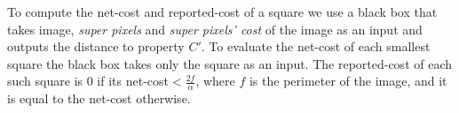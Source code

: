 \documentclass[11pt,english]{article}
\newtheorem{theorem}{Theorem}[section]
\newtheorem{definition}{Definition}[section]
\numberwithin{figure}{section}
\newcommand{\eps}{{\epsilon}}
\newcommand{\integerset}[1]{[0..{#1})}
\newcommand{\gp}{\text{GP}}
\newcommand{\lind}{t}
\begin{document}
To compute the net-cost and reported-cost of a square we use a black box that takes   image, \emph{super pixels} and \emph{super pixels' cost} of the image as an input and outputs the distance to property $C'$. To evaluate the net-cost of each smallest square the black box takes only the square as an input. The reported-cost of each such square is $0$ if its net-cost$ < \frac{2f}{\alpha}$, where $f$ is the perimeter of the image, and it is equal to the net-cost otherwise.
\fi

\begin{comment}
\subsection{Tester for Connectedness}\label{sec:connectedness-tester}
\begin{theorem}\label{thm:connectedness_tester}
There is a block-uniform (1-sided error) $\eps$-tester for connectedness with sample and time complexity $O(\frac{1}{\eps^{2}})$.
\end{theorem}
\begin{proof}
Observe that a tester can safely reject if it finds a small connected component and a black pixel outside it.
Our tester (Algorithm~\ref{alg:connectedness_tester-na}) looks for squares that contain small connected components, that is, are not border-connected, which we call witnesses. To find a witness, it samples $r$-squares for $\log\frac 1 \eps+1$ values of $r,$ which we call levels. In each subsequent level, the number of samples is doubled, but the side length of the squares is halved, i.e., the number of pixels in them is divided by 4.
If it finds a witness, it samples pixels to look for black pixels outside the witness.

\ifnum\full=1
For simplicity
of the analysis of the algorithm we assume\footnote {This assumption can be made
w.l.o.g.\ because if $n\in(2^{i-1}+1,2^{i}+1)$ for some $i$, instead of the original image $M$ we can consider a $(2^{i}+1)\times (2^{i}+1)$ image $M'$, which is equal to $M$ on the corresponding coordinates and has white pixels everywhere else. Let
$\eps'=\eps n^{2}/(2^{i}+1)^{2}$.
To $\eps$-test $M$ for connectedness, it suffices to $\eps'$-test $M'$ for connectedness.
The resulting tester for $M$ has the desired query complexity because $\eps'=\Theta(\eps)$. If $\eps\in(1/2^{j},1/2^{j-1})$ for
some $j$, to $\eps$-test a property ${\cal P}$, it is sufficient to run an $\eps''$-test for ${\cal P}$ with  $\eps^{\prime\prime}=1/2^{j}<\eps$.}
\else
We can assume w.l.o.g.\
\fi
that $n-1$
and $1/\eps$ are powers of
$2$.
\begin{definition}[Levels, witnesses]
\label{def:Grid_pixels_and_squares_of_different_levels}
For $\lind \in\integerset{\log\frac{1}{\eps}+1},$ let $r_\lind=\frac{4}{\eps}\cdot
2^{-\lind}$ denote the length of level $\lind$.
Pixels of the set $\gp_{r_\lind}$ are called
\emph{grid pixels of level $\lind$}, and squares in the set $S_{r_\lind}$  are called \emph{squares of level} $\lind$.
A square of level $\lind$ which is not border-connected (see Definition~\ref{def:border_connectedness}) is called a \emph{witness}.
\end{definition}


\end{comment}
\end{document}
